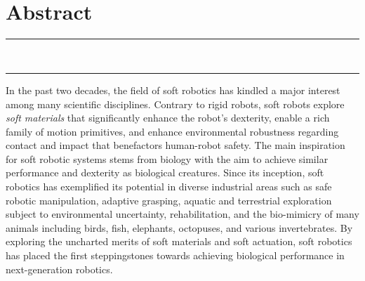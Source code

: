 
\chapter*{\vspace{-45mm}\\ Abstract} %
\vspace{-15mm}
\begin{center}
\rule{\textwidth}{.75pt}\vspace*{1mm}
\textbf{{\Large \maintitle} \\[1.0em]}
\rule{\textwidth}{.75pt}
\end{center}

In the past two decades, the field of soft robotics has kindled a major interest among many scientific disciplines. Contrary to rigid robots, soft robots explore \emph{soft materials} that significantly enhance the robot’s dexterity, enable a rich family of motion primitives, and enhance environmental robustness regarding contact and impact that benefactors human-robot safety. The main inspiration for soft robotic systems stems from biology with the aim to achieve similar performance and dexterity as biological creatures. Since its inception, soft robotics has exemplified its potential in diverse industrial areas such as safe robotic manipulation, adaptive grasping, aquatic and terrestrial exploration subject to environmental uncertainty, rehabilitation, and the bio-mimicry of many animals including birds, fish, elephants, octopuses, and various invertebrates. By exploring the uncharted merits of soft materials and soft actuation, soft robotics has placed the first steppingstones towards achieving biological performance in next-generation robotics.

